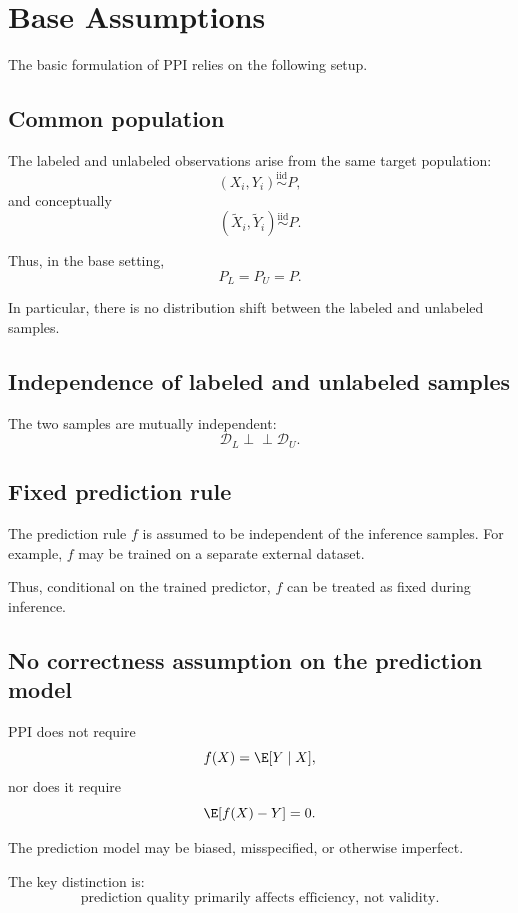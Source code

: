 \section{Base Assumptions}

The basic formulation of PPI relies on the following setup.

\subsection{Common population}

The labeled and unlabeled observations arise from the same target
population:
\[
(X_i,Y_i) \overset{\mathrm{iid}}{\sim} P,
\]
and conceptually
\[
(\widetilde X_i,\widetilde Y_i)
\overset{\mathrm{iid}}{\sim} P.
\]

Thus, in the base setting,
\[
P_L=P_U=P.
\]

In particular, there is no distribution shift between the labeled and
unlabeled samples.

\subsection{Independence of labeled and unlabeled samples}

The two samples are mutually independent:
\[
\mathcal{D}_L
\perp\!\!\!\perp
\mathcal{D}_U.
\]

\subsection{Fixed prediction rule}

The prediction rule $f$ is assumed to be independent of the inference
samples. For example, $f$ may be trained on a separate external dataset.

Thus, conditional on the trained predictor, $f$ can be treated as fixed
during inference.

\subsection{No correctness assumption on the prediction model}

PPI does not require
\[
f(X)=\E[Y\mid X],
\]
nor does it require
\[
\E[f(X)-Y]=0.
\]

The prediction model may be biased, misspecified, or otherwise imperfect.

The key distinction is:
\[
\boxed{
\text{prediction quality primarily affects efficiency, not validity}.
}
\]

